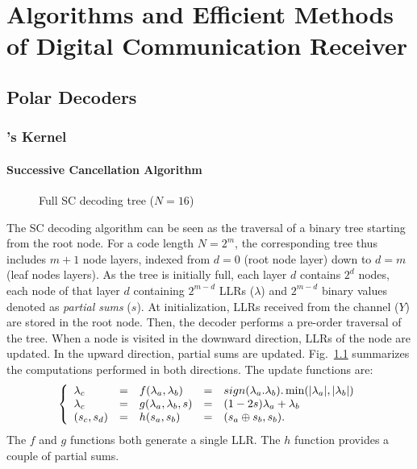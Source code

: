 \graphicspath{{main/chapter2/fig/}}

\chapter{Algorithms and Efficient Methods of Digital Communication Receiver}

\minitoccustom

\section{Polar Decoders}
\label{sec:alg_polar_decoders}

\subsection{\Arikan's Kernel}

\subsubsection{Successive Cancellation Algorithm}

\begin{figure}[htp]
  \centering
  
  \caption{Full SC decoding tree ($N = 16$)}
  \label{fig:polar_sc_decoder}
\end{figure}

The SC decoding algorithm can be seen as the traversal of a binary tree starting
from the root node. For a code length $N=2^m$, the corresponding tree thus
includes $m + 1$ node layers, indexed from $d=0$ (root node layer) down to
$d=m$ (leaf nodes layers). As the tree is initially full, each layer $d$
contains $2^d$ nodes, each node of that layer $d$  containing $2^{m-d}$ LLRs
($\lambda$) and $2^{m-d}$ binary values denoted as \textit{partial sums} ($s$).
At initialization, LLRs received  from the channel ($Y$) are stored in the root
node. Then, the decoder performs a pre-order traversal of the tree. When a node
is visited in the downward direction, LLRs of the node are updated. In the
upward direction, partial sums are updated. Fig.~\ref{fig:polar_sc_decoder}
summarizes the computations performed in both directions. The update functions
are:
\begin{eqnarray}
\left\{\begin{array}{l c l c l}
\lambda_c &=& f(\lambda_a,\lambda_b) &=& sign(\lambda_a.\lambda_b).\min(|\lambda_a|,|\lambda_b|)\\
\lambda_c &=& g(\lambda_a,\lambda_b,s)&=&(1-2s)\lambda_a+\lambda_b\\
(s_{c}, s_{d}) &=& h(s_{a}, s_{b}) &=& (s_{a} \oplus s_{b}, s_{b}).
\end{array}\right.
\label{eq:polar_f_g_h}
\end{eqnarray}
The $f$ and $g$ functions both generate a single LLR. The $h$ function provides
a couple of partial sums.

